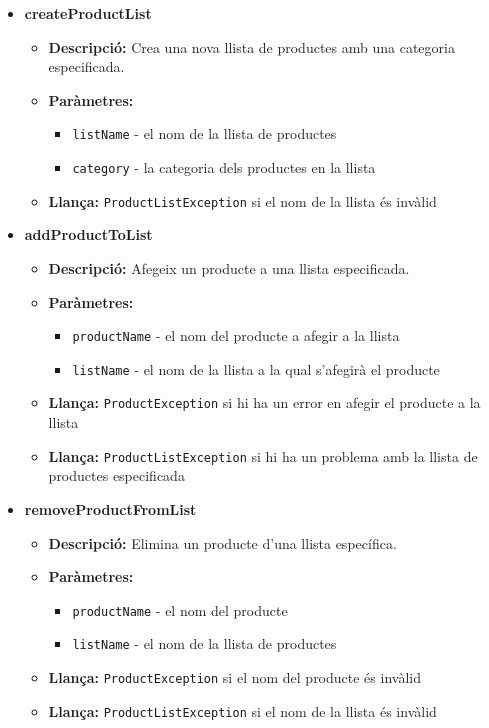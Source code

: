 \documentclass[a4paper, t]{article}
\begin{document}
\begin{itemize}
    \item \textbf{createProductList}
    \begin{itemize}
        \item \textbf{Descripció:} Crea una nova llista de productes amb una categoria especificada.
        \item \textbf{Paràmetres:}
        \begin{itemize}
            \item \texttt{listName} - el nom de la llista de productes
            \item \texttt{category} - la categoria dels productes en la llista
        \end{itemize}
        \item \textbf{Llança:} \texttt{ProductListException} si el nom de la llista és invàlid
    \end{itemize}

    \item \textbf{addProductToList}
    \begin{itemize}
        \item \textbf{Descripció:} Afegeix un producte a una llista especificada.
        \item \textbf{Paràmetres:}
        \begin{itemize}
            \item \texttt{productName} - el nom del producte a afegir a la llista
            \item \texttt{listName} - el nom de la llista a la qual s'afegirà el producte
        \end{itemize}
        \item \textbf{Llança:} \texttt{ProductException} si hi ha un error en afegir el producte a la llista
        \item \textbf{Llança:} \texttt{ProductListException} si hi ha un problema amb la llista de productes especificada
    \end{itemize}

    \item \textbf{removeProductFromList}
    \begin{itemize}
        \item \textbf{Descripció:} Elimina un producte d'una llista específica.
        \item \textbf{Paràmetres:}
        \begin{itemize}
            \item \texttt{productName} - el nom del producte
            \item \texttt{listName} - el nom de la llista de productes
        \end{itemize}
        \item \textbf{Llança:} \texttt{ProductException} si el nom del producte és invàlid
        \item \textbf{Llança:} \texttt{ProductListException} si el nom de la llista és invàlid
    \end{itemize}


\end{itemize}
\end{document}
